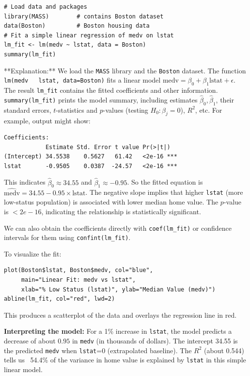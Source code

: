 \documentclass[11pt]{article}
\begin{document}
\begin{verbatim}
# Load data and packages
library(MASS)        # contains Boston dataset
data(Boston)         # Boston housing data
# Fit a simple linear regression of medv on lstat
lm_fit <- lm(medv ~ lstat, data = Boston)
summary(lm_fit)
\end{verbatim}

**Explanation:** We load the \texttt{MASS} library and the \texttt{Boston} dataset. The function \texttt{lm(medv ~ lstat, data=Boston)} fits a linear model $\text{medv} = \beta_0 + \beta_1 \text{lstat} + \epsilon$. The result \texttt{lm\_fit} contains the fitted coefficients and other information. \texttt{summary(lm\_fit)} prints the model summary, including estimates $\hat\beta_0, \hat\beta_1$, their standard errors, $t$-statistics and $p$-values (testing $H_0: \beta_j=0$), $R^2$, etc. For example, output might show:

\begin{verbatim}
Coefficients:
            Estimate Std. Error t value Pr(>|t|)    
(Intercept) 34.5538    0.5627   61.42   <2e-16 ***
lstat       -0.9505    0.0387  -24.57   <2e-16 ***
\end{verbatim}

This indicates $\hat\beta_0 \approx 34.55$ and $\hat\beta_1 \approx -0.95$. So the fitted equation is $\widehat{\text{medv}} = 34.55 - 0.95 \times \text{lstat}$. The negative slope implies that higher \texttt{lstat} (more low-status population) is associated with lower median home value. The $p$-value is $<2e-16$, indicating the relationship is statistically significant.

We can also obtain the coefficients directly with \texttt{coef(lm\_fit)} or confidence intervals for them using \texttt{confint(lm\_fit)}.

To visualize the fit:
\begin{verbatim}
plot(Boston$lstat, Boston$medv, col="blue",
     main="Linear Fit: medv vs lstat", 
     xlab="% Low Status (lstat)", ylab="Median Value (medv)")
abline(lm_fit, col="red", lwd=2)
\end{verbatim}
This produces a scatterplot of the data and overlays the regression line in red.

\textbf{Interpreting the model:} For a 1\% increase in \texttt{lstat}, the model predicts a decrease of about $0.95$ in \texttt{medv} (in thousands of dollars). The intercept 34.55 is the predicted \texttt{medv} when \texttt{lstat}=0 (extrapolated baseline). The $R^2$ (about 0.544) tells us ~54.4\% of the variance in home value is explained by \texttt{lstat} in this simple linear model.
\end{document}
